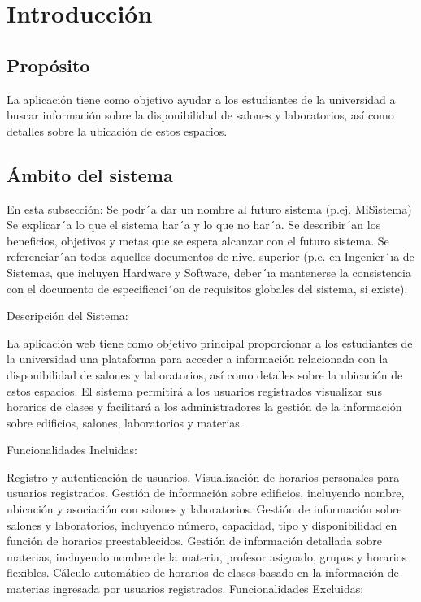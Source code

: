 
\section{Introducción}

\subsection{Propósito}
La aplicación tiene como objetivo ayudar a los estudiantes de la universidad a buscar información sobre la disponibilidad de salones y laboratorios, así como detalles sobre la ubicación de estos espacios.

\subsection{Ámbito del sistema}
En esta subsección:
Se podr´a dar un nombre al futuro sistema (p.ej. MiSistema)
Se explicar´a lo que el sistema har´a y lo que no har´a.
Se describir´an los beneficios, objetivos y metas que se espera alcanzar
con el futuro sistema.
Se referenciar´an todos aquellos documentos de nivel superior (p.e. en Ingenier´ıa de Sistemas, que incluyen Hardware y Software, deber´ıa mantenerse la consistencia con el documento de especificaci´on de requisitos
globales del sistema, si existe).

Descripción del Sistema:

La aplicación web tiene como objetivo principal proporcionar a los estudiantes de la universidad una plataforma para acceder a información relacionada con la disponibilidad de salones y laboratorios, así como detalles sobre la ubicación de estos espacios. El sistema permitirá a los usuarios registrados visualizar sus horarios de clases y facilitará a los administradores la gestión de la información sobre edificios, salones, laboratorios y materias.

Funcionalidades Incluidas:

Registro y autenticación de usuarios.
Visualización de horarios personales para usuarios registrados.
Gestión de información sobre edificios, incluyendo nombre, ubicación y asociación con salones y laboratorios.
Gestión de información sobre salones y laboratorios, incluyendo número, capacidad, tipo y disponibilidad en función de horarios preestablecidos.
Gestión de información detallada sobre materias, incluyendo nombre de la materia, profesor asignado, grupos y horarios flexibles.
Cálculo automático de horarios de clases basado en la información de materias ingresada por usuarios registrados.
Funcionalidades Excluidas:

